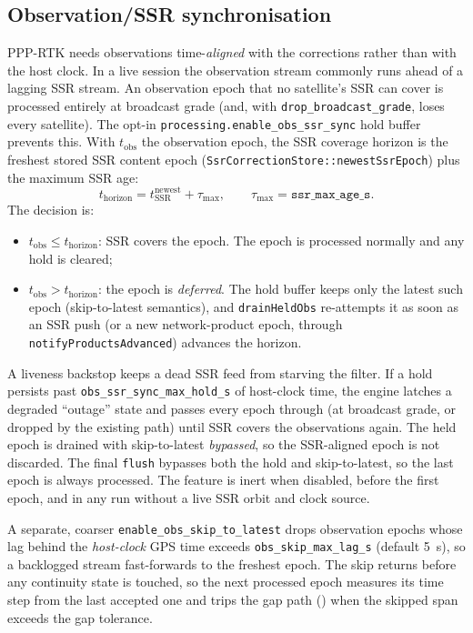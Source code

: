 \documentclass[main.tex]{subfiles}
\begin{document}
\subsection{Observation/SSR synchronisation}\label{sec:rt-sync}

PPP-RTK needs observations time-\emph{aligned} with the corrections
rather than with the host clock.  In a live session the observation
stream commonly runs ahead of a lagging SSR stream.  An observation
epoch that no satellite's SSR can cover is processed entirely at
broadcast grade (and, with \texttt{drop\_broadcast\_grade}, loses every
satellite).  The opt-in \texttt{processing.enable\_obs\_ssr\_sync} hold
buffer prevents this.  With $t_{\text{obs}}$ the observation epoch, the
SSR coverage horizon is the freshest stored SSR content epoch
(\texttt{SsrCorrectionStore::newestSsrEpoch}) plus the maximum SSR age:
\begin{equation}
t_{\text{horizon}} =
  t_{\text{SSR}}^{\text{newest}} + \tau_{\text{max}},
\qquad
\tau_{\text{max}} = \texttt{ssr\_max\_age\_s}.
\label{eq:rt-horizon}
\end{equation}
The decision is:
\begin{itemize}[leftmargin=*, itemsep=0pt]
\item $t_{\text{obs}} \le t_{\text{horizon}}$: SSR covers the epoch.  The
      epoch is processed normally and any hold is cleared;
\item $t_{\text{obs}} > t_{\text{horizon}}$: the epoch is
      \emph{deferred}.  The hold buffer keeps only the latest such epoch
      (skip-to-latest semantics), and \texttt{drainHeldObs} re-attempts
      it as soon as an SSR push (or a new network-product epoch,
      through \texttt{notifyProductsAdvanced}) advances the horizon.
\end{itemize}
A liveness backstop keeps a dead SSR feed from starving the filter.  If
a hold persists past \texttt{obs\_ssr\_sync\_max\_hold\_s} of host-clock
time, the engine latches a degraded ``outage'' state and passes every
epoch through (at broadcast grade, or dropped by the existing path)
until SSR covers the observations again.  The held epoch is drained with
skip-to-latest \emph{bypassed}, so the SSR-aligned epoch is not
discarded.  The final \texttt{flush} bypasses both the hold and
skip-to-latest, so the last epoch is always processed.  The feature is
inert when disabled, before the first epoch, and in any run without a
live SSR orbit and clock source.

A separate, coarser \texttt{enable\_obs\_skip\_to\_latest} drops
observation epochs whose lag behind the \emph{host-clock} GPS time
exceeds \texttt{obs\_skip\_max\_lag\_s} (default \SI{5}{\second}), so a
backlogged stream
fast-forwards to the freshest epoch.  The skip returns before any
continuity state is touched, so the next processed epoch measures its
time step from the last accepted one and trips the gap path
() when the skipped span exceeds the gap tolerance.
\end{document}
